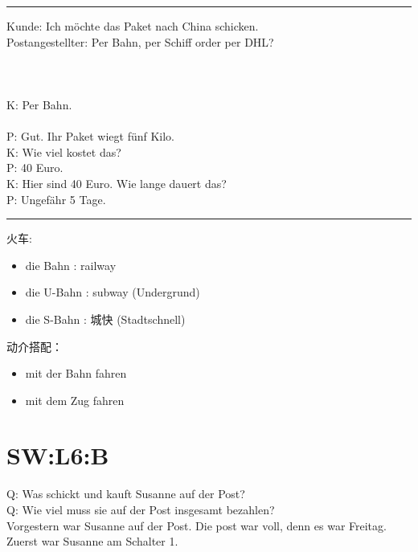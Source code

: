 \rule{\textwidth}{0.05em}

\noindent
Kunde: Ich möchte das Paket nach China schicken. \\
Postangestellter: Per Bahn, per Schiff order per DHL?  \\
\\
\\
\\
\noindent
K: Per Bahn.  \\
\\
\noindent
P: Gut. Ihr Paket wiegt fünf Kilo.  \\
K: Wie viel kostet das? \\
P: 40 Euro. \\
K: Hier sind 40 Euro. Wie lange dauert das? \\
P: Ungefähr 5 Tage. \\

\rule{\textwidth}{0.05em}
火车:
\begin{itemize}
    \item die Bahn \sqr[color=yellow]: railway \\
    \item die U-Bahn \sqr[color=yellow]: subway (Undergrund) \\
    \item die S-Bahn \sqr[color=yellow]: 城快 (Stadtschnell) \\
\end{itemize}
动介搭配：
\begin{itemize}
    \item mit der Bahn fahren
    \item mit dem Zug fahren
\end{itemize}

\section{SW:L6:B}

\noindent
Q: Was schickt und kauft Susanne auf der Post? \\
Q: Wie viel muss sie auf der Post insgesamt bezahlen? \\
Vorgestern war Susanne auf der Post.  Die post war voll, denn es war Freitag.  \\
Zuerst war Susanne am Schalter 1.  \\

